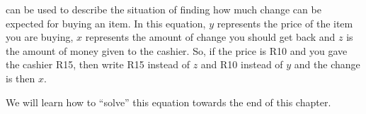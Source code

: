      \label{m38346*id172278}can be used to describe the situation of finding how much change can be expected for buying an item. In this equation, $y$ represents the price of the item you are buying, $x$ represents the amount of change you should get back and $z$ is the amount of money given to the cashier. So, if the price is R10 and you gave the cashier R15, then write R15 instead of $z$ and R10 instead of $y$ and the change is then $x$.\par 
      \label{m38346*uid5}\nopagebreak\noindent{}
      \label{m38346*id172357}We will learn how to ``solve'' this equation towards the end of this chapter.\par 
